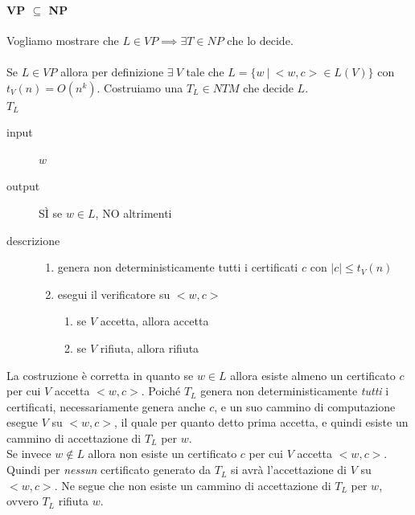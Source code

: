 \paragraph{VP $\subseteq$ NP} 

Vogliamo mostrare che $L \in VP \implies \exists T \in NP \text{ che lo decide}$.
\\
\\
Se $L \in VP$ allora per definizione $\exists \ V$ tale che $ L = \{ w \ | \ <w, c> \in L(V) \}$ con $t_V(n) = O(n^k)$. Costruiamo una $T_L \in NTM$ che decide $L$.
\\

$T_L$
\begin{description}
	\item[input] $w$ 
	\item[output] SÌ se $w \in L$, NO altrimenti
	\item[descrizione]
	\begin{enumerate}[label*=\arabic*.]
		\item genera non deterministicamente tutti i certificati $c$ con $|c| \leq t_V(n)$

		\item esegui il verificatore su $<w, c>$
		\begin{enumerate}[label*=\arabic*.]
			\item se $V$ accetta, allora accetta
			\item se $V$ rifiuta, allora rifiuta
		\end{enumerate}
	\end{enumerate}
\end{description}

La costruzione è corretta in quanto se $w \in L$ allora esiste almeno un certificato $c$ per cui $V$ accetta $<w, c>$. Poiché $T_L$ genera non deterministicamente \emph{tutti} i certificati, necessariamente genera anche $c$, e un suo cammino di computazione esegue $V$ su $<w, c>$, il quale per quanto detto prima accetta, e quindi esiste un cammino di accettazione di $T_L$ per $w$.
\\
Se invece $w \notin L$ allora non esiste un certificato $c$ per cui $V$ accetta $<w, c>$. Quindi per \emph{nessun} certificato generato da $T_L$ si avrà l'accettazione di $V$ su $<w, c>$. Ne segue che non esiste un cammino di accettazione di $T_L$ per $w$, ovvero $T_L$ rifiuta $w$.
